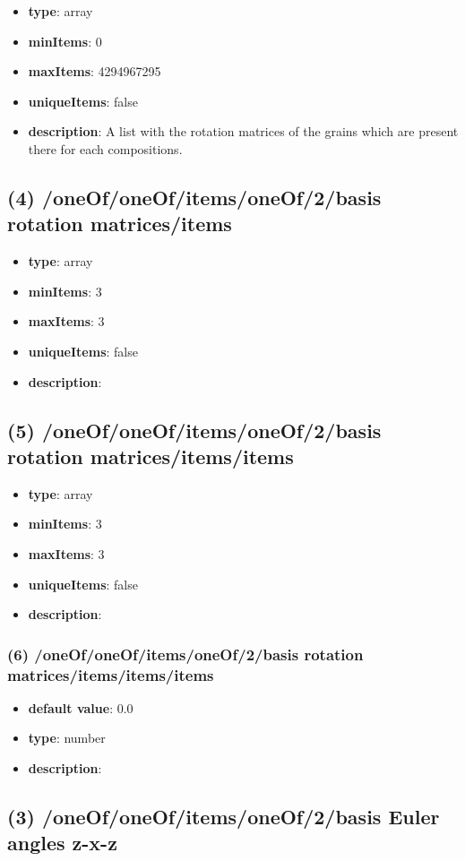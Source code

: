 \begin{itemize}[leftmargin=3em]\item {\bf type}: array
\item {\bf minItems}: 0
\item {\bf maxItems}: 4294967295
\item {\bf uniqueItems}: false
\item {\bf description}: A list with the rotation matrices of the grains which are present there for each compositions.
\end{itemize}\subsection{(4) /oneOf/oneOf/items/oneOf/2/basis rotation matrices/items}
\begin{itemize}[leftmargin=4em]\item {\bf type}: array
\item {\bf minItems}: 3
\item {\bf maxItems}: 3
\item {\bf uniqueItems}: false
\item {\bf description}: 
\end{itemize}\subsection{(5) /oneOf/oneOf/items/oneOf/2/basis rotation matrices/items/items}
\begin{itemize}[leftmargin=5em]\item {\bf type}: array
\item {\bf minItems}: 3
\item {\bf maxItems}: 3
\item {\bf uniqueItems}: false
\item {\bf description}: 
\end{itemize}\subsubsection{(6) /oneOf/oneOf/items/oneOf/2/basis rotation matrices/items/items/items}
\begin{itemize}[leftmargin=6em]\item {\bf default value}: 0.0
\item {\bf type}: number
\item {\bf description}: 
\end{itemize}\subsection{(3) /oneOf/oneOf/items/oneOf/2/basis Euler angles z-x-z}
